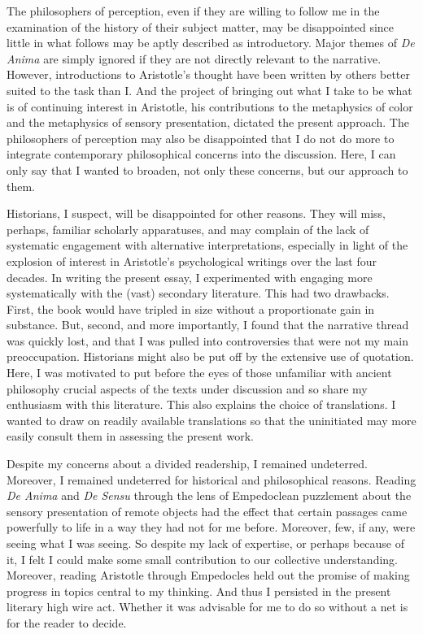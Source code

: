 The philosophers of perception, even if they are willing to follow me in the examination of the history of their subject matter, may be disappointed since little in what follows may be aptly described as introductory. Major themes of \emph{De Anima} are simply ignored if they are not directly relevant to the narrative. However, introductions to Aristotle's thought have been written by others better suited to the task than I. And the project of bringing out what I take to be what is of continuing interest in Aristotle, his contributions to the metaphysics of color and the metaphysics of sensory presentation, dictated the present approach. The philosophers of perception may also be disappointed that I do not do more to integrate contemporary philosophical concerns into the discussion. Here, I can only say that I wanted to broaden, not only these concerns, but our approach to them.

Historians, I suspect, will be disappointed for other reasons. They will miss, perhaps, familiar scholarly apparatuses, and may complain of the lack of systematic engagement with alternative interpretations, especially in light of the explosion of interest in Aristotle's psychological writings over the last four decades. In writing the present essay, I experimented with engaging more systematically with the (vast) secondary literature. This had two drawbacks. First, the book would have tripled in size without a proportionate gain in substance. But, second, and more importantly, I found that the narrative thread was quickly lost, and that I was pulled into controversies that were not my main preoccupation. Historians might also be put off by the extensive use of quotation. Here, I was motivated to put before the eyes of those unfamiliar with ancient philosophy crucial aspects of the texts under discussion and so share my enthusiasm with this literature. This also explains the choice of translations. I wanted to draw on readily available translations so that the uninitiated may more easily consult them in assessing the present work.

Despite my concerns about a divided readership, I remained undeterred. Moreover, I remained undeterred for historical and philosophical reasons. Reading \emph{De Anima} and \emph{De Sensu} through the lens of Empedoclean puzzlement about the sensory presentation of remote objects had the effect that certain passages came powerfully to life in a way they had not for me before. Moreover, few, if any, were seeing what I was seeing. So despite my lack of expertise, or perhaps because of it, I felt I could make some small contribution to our collective understanding. Moreover, reading Aristotle through Empedocles held out the promise of making progress in topics central to my thinking. And thus I persisted in the present literary high wire act. Whether it was advisable for me to do so without a net is for the reader to decide.

